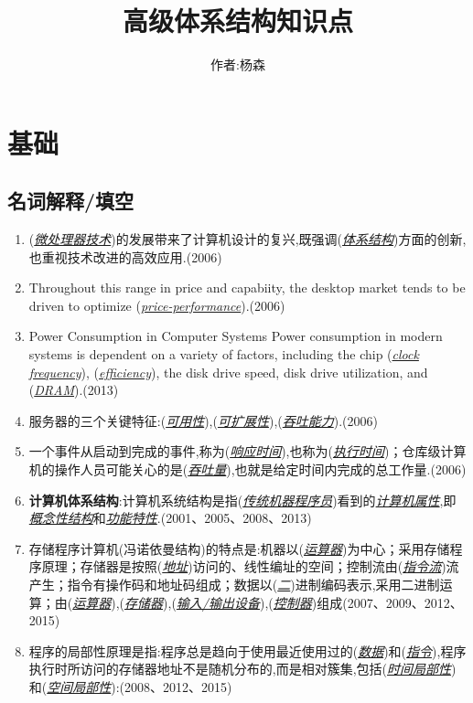 \documentclass[a4paper]{ctexart}
\newcommand{\blank}[1]{(\emph{\underline{#1}})}
\begin{document}
\title{高级体系结构知识点}
\author{作者:杨森}
\maketitle

\newpage
\section{基础}
\subsection{名词解释/填空}
\begin{enumerate}
  \item (\emph{\underline{微处理器技术}})的发展带来了计算机设计的复兴,既强调(\emph{\underline{体系结构}})方面的创新,也重视技术改进的高效应用.(2006)
  \item Throughout this range in price and capabiity, the desktop market tends to be driven to optimize (\emph{\underline{price-performance}}).(2006)
  \item Power Consumption in Computer Systems Power consumption in modern systems is dependent on a variety of factors, including the chip \blank{clock frequency}, \blank{efficiency}, the disk drive speed, disk drive utilization, and \blank{DRAM}.(2013)
  \item 服务器的三个关键特征:(\emph{\underline{可用性}}),(\emph{\underline{可扩展性}}),(\emph{\underline{吞吐能力}}).(2006)
  \item 一个事件从启动到完成的事件,称为(\emph{\underline{响应时间}}),也称为(\emph{\underline{执行时间}})；仓库级计算机的操作人员可能关心的是(\emph{\underline{吞吐量}}),也就是给定时间内完成的总工作量.(2006)
  \item \textbf{计算机体系结构}:计算机系统结构是指\blank{传统机器程序员}看到的\underline{\emph{计算机属性}},即\underline{\emph{概念性结构}}和\underline{\emph{功能特性}}.(2001、2005、2008、2013)
  \item 存储程序计算机(冯诺依曼结构)的特点是:机器以(\emph{\underline{运算器}})为中心；采用存储程序原理；存储器是按照(\emph{\underline{地址}})访问的、线性编址的空间；控制流由(\emph{\underline{指令流}})流产生；指令有操作码和地址码组成；数据以(\emph{\underline{二}})进制编码表示,采用二进制运算；由\blank{运算器},\blank{存储器},\blank{输入/输出设备},\blank{控制器}组成(2007、2009、2012、2015)
  \item 程序的局部性原理是指:程序总是趋向于使用最近使用过的(\emph{\underline{数据}})和(\emph{\underline{指令}}),程序执行时所访问的存储器地址不是随机分布的,而是相对簇集,包括(\emph{\underline{时间局部性}})和(\emph{\underline{空间局部性}}):(2008、2012、2015)

\end{enumerate}
\end{document}
